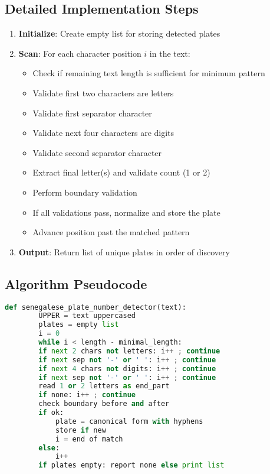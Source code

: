 \documentclass[12pt,a4paper]{article}
\begin{document}
\subsection{Detailed Implementation Steps}
\begin{enumerate}
    \item \textbf{Initialize}: Create empty list for storing detected plates
    \item \textbf{Scan}: For each character position $i$ in the text:
    \begin{itemize}
        \item Check if remaining text length is sufficient for minimum pattern
        \item Validate first two characters are letters
        \item Validate first separator character
        \item Validate next four characters are digits
        \item Validate second separator character
        \item Extract final letter(s) and validate count (1 or 2)
        \item Perform boundary validation
        \item If all validations pass, normalize and store the plate
        \item Advance position past the matched pattern
    \end{itemize}
    \item \textbf{Output}: Return list of unique plates in order of discovery
\end{enumerate}

\subsection{Algorithm Pseudocode}
\begin{lstlisting}[language=Python, caption=Manual Parsing Algorithm]
    def senegalese_plate_number_detector(text):
        UPPER = text uppercased
        plates = empty list
        i = 0
        while i < length - minimal_length:
        if next 2 chars not letters: i++ ; continue
        if next sep not '-' or ' ': i++ ; continue
        if next 4 chars not digits: i++ ; continue
        if next sep not '-' or ' ': i++ ; continue
        read 1 or 2 letters as end_part
        if none: i++ ; continue
        check boundary before and after
        if ok:
            plate = canonical form with hyphens
            store if new
            i = end of match
        else:
            i++
        if plates empty: report none else print list
\end{lstlisting}
\end{document}
